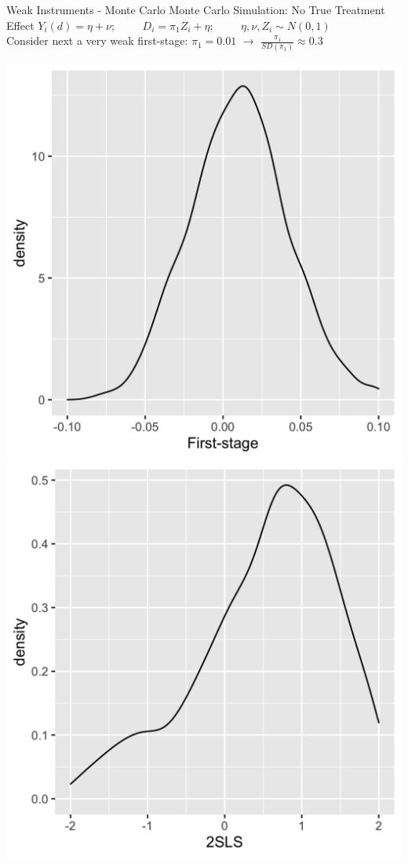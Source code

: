 \documentclass[11pt,english,handout]{beamer}
\begin{document}
\begin{frame}{Weak Instruments - Monte Carlo}
	Monte Carlo Simulation: No True Treatment Effect
	$Y_i(d)= \eta + \nu; \hspace{1cm}  D_i = \pi_1 Z_i + \eta; \hspace{1cm}  \eta, \nu, Z_i \sim N(0,1)$ 	\\
	
	Consider next a very weak first-stage: $\pi_1 =0.01$ $\rightarrow$ $\frac{\pi_1}{SD(\pi_1)} \approx 0.3$
	
	\includegraphics[width = 0.45 \linewidth]{fs-weak} \pause{} \includegraphics[width = 0.45 \linewidth]{iv-weak}
\end{frame}
\end{document}

